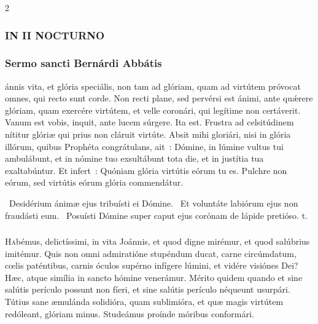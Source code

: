 \documentclass[9pt,twoside]{extarticle}
\begin{document}
\begin{multicols}{2}
\smallskip
\indent \small {}



\normalsize
\subsubsection*{\center \small \textsc{IN II NOCTURNO}}
\subsubsection*{\center \normalfont Sermo sancti Bernárdi Abbátis\\
\small {}}
ánnis vita, et glória speciális, non tam ad glóriam, quam ad virtútem próvocat omnes, qui recto sunt corde. Non recti plane, sed pervérsi est ánimi, ante quǽrere glóriam, quam exercére virtútem, et velle coronári, qui legítime non certáverit. Vanum est vobis, inquit, ante lucem súrgere. Ita est. Frustra ad celsitúdinem nítitur glóriæ qui prius non cláruit virtúte. Absit mihi gloriári, nisi in glória illórum, quibus Prophéta congrátulans, ait~: Dómine, in lúmine vultus tui ambulábunt, et in nómine tuo exsultábunt tota die, et in justítia tua exaltabúntur. Et infert~: Quóniam glória virtútis eórum tu es. Pulchre non eórum, sed virtútis eórum glória commendátur.

~Desidérium ánimæ ejus tribuísti ei Dómine. \textred{*}~Et voluntáte labiórum ejus non fraudásti eum. ~Posuísti Dómine super caput ejus corónam de lápide pretióso. t.

\subsubsection*{\center \normalfont {}}
\lettrine{H}abémus, delictíssimi, in vita Joánnis, et quod digne mirémur, et quod salúbrius imitémur. Quis non omni admiratióne stupéndum ducat, carne circúmdatum, cœlis paténtibus, carnis óculos supérno infígere lúmini, et vidére visiónes Dei? Hæc, atque simília in sancto hómine venerámur. Mérito quidem quando et sine salútis perículo possunt non fíeri, et sine salútis perículo néqueunt usurpári. Tútius sane æmulánda solidióra, quam sublimióra, et quæ magis virtútem redóleant, glóriam minus. Studeámus proínde móribus conformári.


\end{multicols}
\end{document}
